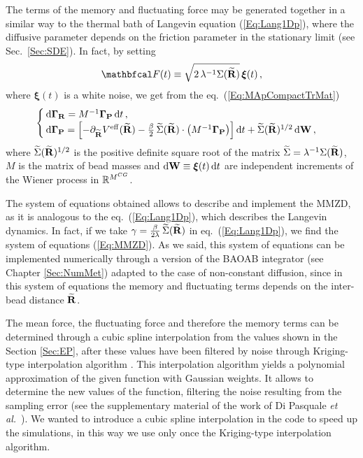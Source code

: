 \documentclass[10pt,a4paper]{book}
\theoremstyle{definition}
\begin{document}
\noindent
The terms of the memory and fluctuating force may be generated together in a similar way to the thermal bath of Langevin equation (\ref{Eq:Lang1Dp}), where the diffusive parameter depends on the friction parameter in the stationary limit (see Sec.~\ref{Sec:SDE}). In fact, by setting
\[
 \fprojbf(t) \equiv \sqrt{2\,\lambda^{-1}\Sigma(\widetilde{\bfR})}\, \boldsymbol{\xi}(t)\,,
\] 
where $\boldsymbol{\xi}(t)$ is a white noise, we get from the eq.~(\ref{Eq:MApCompactTrMat})
\begin{equation}
\label{Eq:MMZD}
\begin{cases}
 \mbox{d} \boldsymbol\Gamma_{\mathbf{R}} = M^{-1}\boldsymbol\Gamma_{\mathbf{P}} \,\mbox{d} t \,, & \\
 \mbox{d} \boldsymbol\Gamma_{\mathbf{P}} = \left[ - \partial_{\widetilde{\mathbf{R}}}V^{\mathrm{eff}}(\widetilde{\mathbf{R}}) 
                     - \frac{\beta}{2}\, \widetilde{\Sigma}(\widetilde{\mathbf{R}}) \cdot \left(M^{-1}\boldsymbol\Gamma_{\mathbf{P}}\right) \right]\mbox{d} t 
                     + \widetilde{\Sigma} (\widetilde{\mathbf{R}})^{1/2} \,\mbox{d} \mathbf{W} \,, &  
\end{cases}
\end{equation}
where $\widetilde{\Sigma}(\widetilde{\mathbf{R}})^{1/2}$ is the positive definite square root of the matrix $\widetilde{\Sigma}=\lambda^{-1}\Sigma(\widetilde{\mathbf{R}})$, $M$ is the matrix of bead masses and $\mbox{d} \mathbf{W} \equiv \boldsymbol{\xi}(t) \,\mbox{d} t$ are independent increments of the Wiener process in $\mathbb{R}^{M^{CG}}$.

The system of equations obtained allows to describe and implement the MMZD, as it is analogous to the eq.~(\ref{Eq:Lang1Dp}), which describes the Langevin dynamics. In fact, if we take $\gamma=\frac{\beta}{2\lambda}\, \widetilde{\Sigma}(\widetilde{\mathbf{R}})$ in eq.~(\ref{Eq:Lang1Dp}), we find the system of equations (\ref{Eq:MMZD}). As we said, this system of equations can be implemented numerically through a version of the BAOAB integrator (see Chapter \ref{Sec:NumMet}) adapted to the case of non-constant diffusion, since in this system of equations the memory and fluctuating terms depends on the inter-bead distance $\widetilde{\mathbf{R}}$. 

The mean force, the fluctuating force and therefore the memory terms can be determined through a cubic spline interpolation from the values shown in the Section \ref{Sec:EP}, after these values have been filtered by noise through Kriging-type interpolation algorithm \cite{Jones2001}. This interpolation algorithm yields a polynomial approximation of the given function with Gaussian weights. It allows to determine the new values of the function, filtering the noise resulting from the sampling error (see the supplementary material of the work of Di Pasquale \textit{et al.}~\cite{DiPasquale2019}). We wanted to introduce a cubic spline interpolation in the code to speed up the simulations, in this way we use only once the Kriging-type interpolation algorithm.
\end{document}
